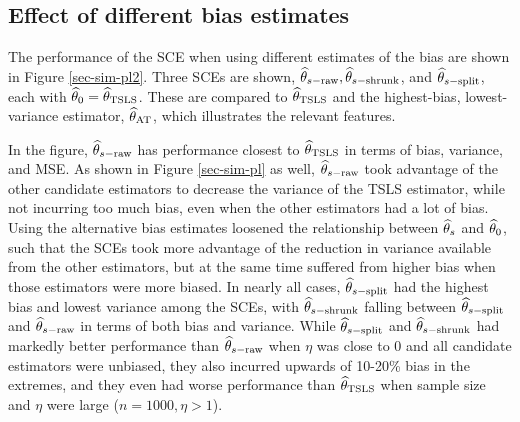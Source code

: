 \documentclass{article}
\def\sat{_{\text{AT}}}
\def\stsls{_{\text{TSLS}}}
\def\sraw{_{s-\text{raw}}}
\def\sshrunk{_{s-\text{shrunk}}}
\def\ssplit{_{s-\text{split}}}
\def\thraw{\thetahat\sraw}
\def\thshr{\thetahat\sshrunk}
\def\thspl{\thetahat\ssplit}
\begin{document}
\subsection{Effect of different bias estimates}
The performance of the SCE when using different estimates of the bias are shown in Figure \ref{sec-sim-pl2}. Three SCEs are shown, $\thraw, \thshr$, and $\thspl$, each with $\thetahat_0 = \thetahat\stsls$. These are compared to $\thetahat\stsls$ and the highest-bias, lowest-variance estimator, $\thetahat\sat$, which illustrates the relevant features. 

In the figure, $\thraw$ has performance closest to $\thetahat\stsls$ in terms of bias, variance, and MSE. As shown in Figure \ref{sec-sim-pl} as well, $\thraw$ took advantage of the other candidate estimators to decrease the variance of the TSLS estimator, while not incurring too much bias, even when the other estimators had a lot of bias. Using the alternative bias estimates loosened the relationship between ${\widehat\theta}_s$ and ${\widehat\theta}_0$, such that the SCEs took more advantage of the reduction in variance available from the other estimators, but at the same time suffered from higher bias when those estimators were more biased. In nearly all cases, $\thspl$ had the highest bias and lowest variance among the SCEs, with $\thshr$ falling between $\thspl$ and $\thraw$ in terms of both bias and variance. While $\thspl$ and $\thshr$ had markedly better performance than $\thraw$ when $\eta$ was close to 0 and all candidate estimators were unbiased, they also incurred upwards of 10-20\% bias in the extremes, and they even had worse performance than $\thetahat\stsls$ when sample size and $\eta$ were large ($n = 1000, \eta > 1$). 
\end{document}
